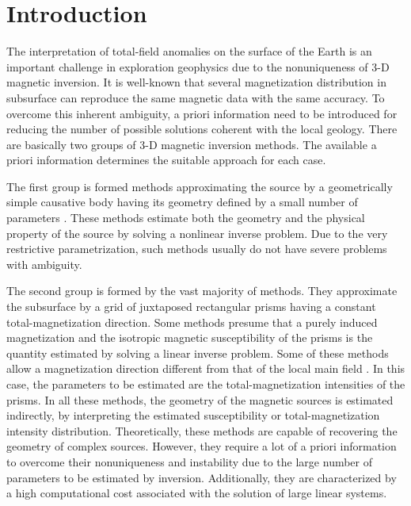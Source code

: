 \section{Introduction}

The interpretation of total-field anomalies on the surface of the Earth is an 
important challenge in exploration geophysics due to the nonuniqueness of 3-D magnetic 
inversion. It is well-known that several magnetization distribution in subsurface 
can reproduce the same magnetic data with the same accuracy. 
To overcome this inherent ambiguity, a priori information need to be introduced 
for reducing the number of possible solutions coherent with the local geology.
There are basically two groups of 3-D magnetic inversion methods. The available 
a priori information determines the suitable approach for each case.

The first group is formed methods approximating the source by a geometrically 
simple causative body having its geometry defined by a small number of parameters 
\citep[e.g., ][]{ballantyne-1980,bhattacharyya-1980,silva-1983}. These methods 
estimate both the geometry and the physical property of the source by solving 
a nonlinear inverse problem. Due to the very restrictive parametrization, 
such methods usually do not have severe problems with ambiguity.

The second group is formed by the vast majority of methods. 
They approximate the subsurface by a grid of juxtaposed rectangular prisms having 
a constant total-magnetization direction. Some methods presume that a purely induced 
magnetization \citep[e.g., ][]{cribb-1976,li_3-d_1996,pilkington_3-d_1997} and the 
isotropic magnetic susceptibility of the prisms is the quantity estimated by solving 
a linear inverse problem. Some of these methods allow a magnetization direction 
different from that of the local main field \cite[e.g., ][]{pignatelli-2006}. 
In this case, the parameters to be estimated are the total-magnetization intensities 
of the prisms. 
In all these methods, the geometry of the magnetic sources is estimated indirectly, 
by interpreting the estimated susceptibility or total-magnetization intensity 
distribution. 
Theoretically, these methods are capable of recovering the geometry of complex 
sources. However, they require a lot of a priori information to overcome 
their nonuniqueness and instability due to the large number of parameters 
to be estimated by inversion. Additionally, they are characterized by a high 
computational cost associated with the solution of large linear systems.

